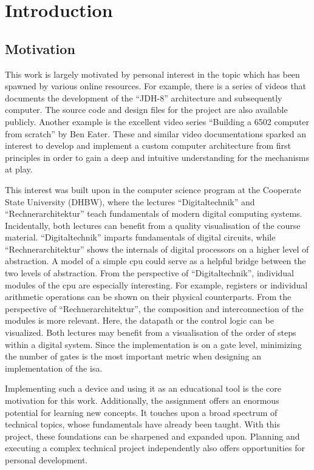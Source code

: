 \section{Introduction}

\subsection{Motivation}

This work is largely motivated by personal interest in the topic which has been spawned by various online resources. For example, there is a series of videos that documents the development of the ``JDH-8'' architecture and subsequently computer\cite{jdh8_1,jdh8_2,jdh8_3,jdh8_4}. The source code and design files for the project are also available publicly\cite{jdh8_repo}. Another example is the excellent video series ``Building a 6502 computer from scratch'' by Ben Eater\cite{eater6502}. These and similar video documentations sparked an interest to develop and implement a custom computer architecture from first principles in order to gain a deep and intuitive understanding for the mechanisms at play.

This interest was built upon in the computer science program at the Cooperate State University (DHBW), where the lectures ``Digitaltechnik'' and ``Rechnerarchitektur'' teach fundamentals of modern digital computing systems. Incidentally, both lectures can benefit from a quality visualisation of the course material. ``Digitaltechnik'' imparts fundamentals of digital circuits, while ``Rechnerarchitektur'' shows the internals of digital processors on a higher level of abstraction. A model of a simple \ac{cpu} could serve as a helpful bridge between the two levels of abstraction. From the perspective of ``Digitaltechnik'', individual modules of the \ac{cpu} are especially interesting. For example, registers or individual arithmetic operations can be shown on their physical counterparts. From the perspective of ``Rechnerarchitektur'', the composition and interconnection of the modules is more relevant. Here, the datapath or the control logic can be visualized. Both lectures may benefit from a visualisation of the order of steps within a digital system. Since the implementation is on a gate level, minimizing the number of gates is the most important metric when designing an implementation of the \ac{isa}.

Implementing such a device and using it as an educational tool is the core motivation for this work. Additionally, the assignment offers an enormous potential for learning new concepts. It touches upon a broad spectrum of technical topics, whose fundamentals have already been taught. With this project, these foundations can be sharpened and expanded upon. Planning and executing a complex technical project independently also offers opportunities for personal development.

